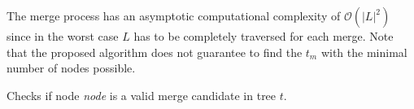 The merge process has an asymptotic computational complexity of $\mathcal{O}(\vert L \vert^2)$ since in the worst case $L$ has to be completely traversed for each merge.
Note that the proposed algorithm does not guarantee to find the $t_m$ with the minimal number of nodes possible. 

\begin{algorithm}[htb]

\nl	{}
\caption{Checks if node \textit{node} is a valid merge candidate in tree $t$.}\label{al:trav}
\end{algorithm}
